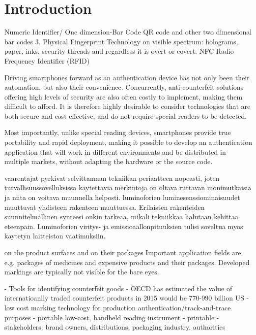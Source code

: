 \documentclass[thesis.tex]{subfiles}
\begin{document}
\chapter{Introduction}
\label{chapter:intro}

Numeric Identifier/ One dimension-Bar Code
QR code and other two dimensional bar codes
3. Physical Fingerprint Technology on visible spectrum: holograms, paper, inks, security threads and regardless it is overt or covert.
NFC Radio Frequency Identifier (RFID)

Driving smartphones forward as an authentication device has not only been their automation, but also their convenience. Concurrently, anti-counterfeit solutions offering high levels of security are also often costly to implement, making them difficult to afford. It is therefore highly desirable to consider technologies that are both secure and cost-effective, and do not require special readers to be detected.

Most importantly, unlike special reading devices, smartphones provide true portability and rapid deployment, making it possible to develop an authentication application that will work in different environments and be distributed in multiple markets, without adapting the hardware or the source code.


vaarentajat pyrkivat selvittamaan tekniikan periaatteen nopeasti, joten turvallisuussovelluksissa kaytettavia merkintoja on oltava riittavan monimutkaisia ja niita on voitava muunnella helposti. luminoforien luminesenssiominaisuudet muuttuvat yhdisteen rakenteen muuttuessa. Erilaisten rakenteiden suunnitelmallinen synteesi onkin tarkeaa, mikali tekniikkaa halutaan kehittaa eteenpain. Luminoforien viritys- ja emissioaallonpituuksien tulisi soveltua myos kaytetyn laitteiston vaatimuksiin.


on the product surfaces and on their packages
Important application fields are e.g. packages of medicines and expensive products and their packages. Developed markings are typically not visible for the bare eyes.

- Tools for identifying counterfeit goods
- OECD has estimated the value of internatioanlly traded counterfeit products in 2015 would be 770-990 billion US
- low cost marking technology for production authentication/track-and-trace purposes
- portable low-cost, handheld reading instrument
- printable
- stakeholders: brand owners, distributions, packaging industry, authorities
\end{document}
